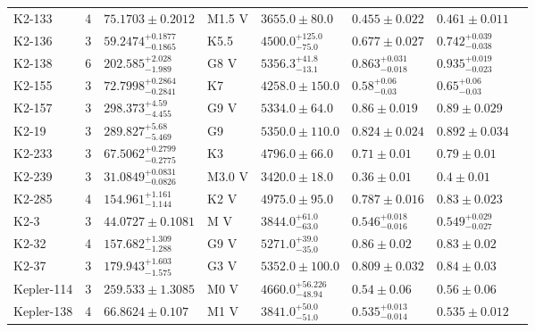\begin{tabular}{lrllllll}
K2-133 & 4 & $75.1703 \pm 0.2012$ & M1.5 V & $3655.0 \pm 80.0$ & $0.455 \pm 0.022$ & $0.461 \pm 0.011$ & \cite{WELLS_ET_AL__2019} \\
K2-136 & 3 & $59.2474^{+0.1877}_{-0.1865}$ & K5.5 & $4500.0^{+125.0}_{-75.0}$ & $0.677 \pm 0.027$ & $0.742^{+0.039}_{-0.038}$ & \cite{MAYO_ET_AL_2023} \\
K2-138 & 6 & $202.585^{+2.028}_{-1.989}$ & G8 V & $5356.3^{+41.8}_{-13.1}$ & $0.863^{+0.031}_{-0.018}$ & $0.935^{+0.019}_{-0.023}$ & \cite{LOPEZ_ET_AL__2019} \\
K2-155 & 3 & $72.7998^{+0.2864}_{-0.2841}$ & K7 & $4258.0 \pm 150.0$ & $0.58^{+0.06}_{-0.03}$ & $0.65^{+0.06}_{-0.03}$ & \cite{D_IACUTE_EZ_ALONSO_ET_AL__2018} \\
K2-157 & 3 & $298.373^{+4.59}_{-4.455}$ & G9 V & $5334.0 \pm 64.0$ & $0.86 \pm 0.019$ & $0.89 \pm 0.029$ & \cite{CASTRO_GONZALEZ_ET_AL_2025} \\
K2-19 & 3 & $289.827^{+5.68}_{-5.469}$ & G9 & $5350.0 \pm 110.0$ & $0.824 \pm 0.024$ & $0.892 \pm 0.034$ & \cite{ALMENARA_ET_AL_2025} \\
K2-233 & 3 & $67.5062^{+0.2799}_{-0.2775}$ & K3 & $4796.0 \pm 66.0$ & $0.71 \pm 0.01$ & $0.79 \pm 0.01$ & \cite{BARRAG_AMP_AACUTE_N_ET_AL__2023} \\
K2-239 & 3 & $31.0849^{+0.0831}_{-0.0826}$ & M3.0 V & $3420.0 \pm 18.0$ & $0.36 \pm 0.01$ & $0.4 \pm 0.01$ & \cite{D_IACUTE_EZ_ALONSO_ET_AL__2018} \\
K2-285 & 4 & $154.961^{+1.161}_{-1.144}$ & K2 V & $4975.0 \pm 95.0$ & $0.787 \pm 0.016$ & $0.83 \pm 0.023$ & \cite{PALLE_ET_AL__2019} \\
K2-3 & 3 & $44.0727 \pm 0.1081$ & M V & $3844.0^{+61.0}_{-63.0}$ & $0.546^{+0.018}_{-0.016}$ & $0.549^{+0.029}_{-0.027}$ & \cite{DIAMOND_LOWE_ET_AL__2022} \\
K2-32 & 4 & $157.682^{+1.309}_{-1.288}$ & G9 V & $5271.0^{+39.0}_{-35.0}$ & $0.86 \pm 0.02$ & $0.83 \pm 0.02$ & \cite{LILLO_BOX_ET_AL__2020} \\
K2-37 & 3 & $179.943^{+1.603}_{-1.575}$ & G3 V & $5352.0 \pm 100.0$ & $0.809 \pm 0.032$ & $0.84 \pm 0.03$ & \cite{HOWARD_ET_AL__2025} \\
Kepler-114 & 3 & $259.533 \pm 1.3085$ & M0 V & $4660.0^{+56.226}_{-48.94}$ & $0.54 \pm 0.06$ & $0.56 \pm 0.06$ & \cite{MORTON_ET_AL__2016} \\
Kepler-138 & 4 & $66.8624 \pm 0.107$ & M1 V & $3841.0^{+50.0}_{-51.0}$ & $0.535^{+0.013}_{-0.014}$ & $0.535 \pm 0.012$ & \cite{PIAULET_ET_AL_2023} \\

\end{tabular}

